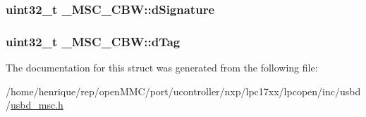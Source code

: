 \hypertarget{struct__MSC__CBW_a1fa625c9bfe68afb30fe973585627c38}{
\subsubsection[{d\-Signature}]{\setlength{\rightskip}{0pt plus 5cm}uint32\-\_\-t \-\_\-\-M\-S\-C\-\_\-\-C\-B\-W\-::d\-Signature}}\label{struct__MSC__CBW_a1fa625c9bfe68afb30fe973585627c38}
\hypertarget{struct__MSC__CBW_a2bc3d8d87456e730b569f155a013fbda}{
\subsubsection[{d\-Tag}]{\setlength{\rightskip}{0pt plus 5cm}uint32\-\_\-t \-\_\-\-M\-S\-C\-\_\-\-C\-B\-W\-::d\-Tag}}\label{struct__MSC__CBW_a2bc3d8d87456e730b569f155a013fbda}


The documentation for this struct was generated from the following file\-:\begin{DoxyCompactItemize}
\item 
/home/henrique/rep/open\-M\-M\-C/port/ucontroller/nxp/lpc17xx/lpcopen/inc/usbd/\hyperlink{usbd__msc_8h}{usbd\-\_\-msc.\-h}\end{DoxyCompactItemize}

